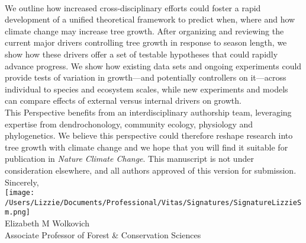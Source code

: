 \documentclass[11pt,a4paper]{article}
\begin{document}
\vspace{1.5ex}\\
We outline how increased cross-disciplinary efforts could foster a rapid development of a unified theoretical framework to predict when, where and how climate change may increase tree growth. After organizing and reviewing the current major drivers controlling tree growth in response to season length, we show how these drivers offer a set of testable hypotheses that could rapidly advance progress. We show how existing data sets and ongoing experiments could provide tests of variation in growth---and potentially controllers on it---across individual to species and ecosystem scales, while new experiments and models can compare effects of external versus internal drivers on growth. 
\vspace{1.5ex}\\
This Perspective benefits from an interdisciplinary authorship team, leveraging expertise from dendrochonology, community ecology, physiology and phylogenetics. We believe this perspective could therefore reshape research into tree growth with climate change and we hope that you will find it suitable for publication in \emph{Nature Climate Change}. This manuscript is not under consideration elsewhere, and all authors approved of this version for submission. 
\vspace{1.5ex}\\
Sincerely,\\

\texttt{[image: /Users/Lizzie/Documents/Professional/Vitas/Signatures/SignatureLizzieSm.png]} \\

\noindent Elizabeth M Wolkovich\\
Associate Professor of Forest \& Conservation Sciences\\ 

\newpage

\end{document}
